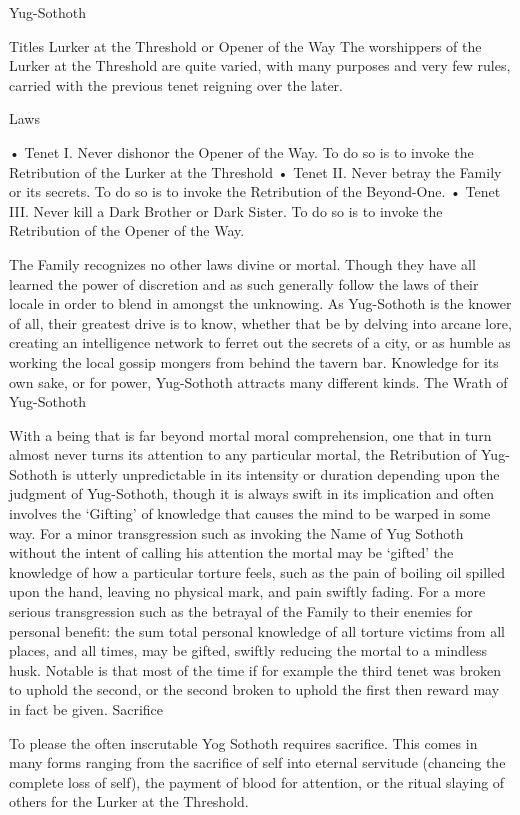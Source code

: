 \documentclass[blue]{guildcamp4}
\begin{document}
\name{\bYog{}}

Yug-Sothoth

Titles Lurker at the Threshold or Opener of the Way
The worshippers of the Lurker at the Threshold are quite varied, with many purposes and very few rules, carried with the previous tenet reigning over the later.

Laws

•	Tenet I. Never dishonor the Opener of the Way. To do so is to invoke the Retribution of the Lurker at the Threshold   
•	Tenet II. Never betray the Family or its secrets. To do so is to invoke the Retribution of the Beyond-One. 
•	Tenet III. Never kill a Dark Brother or Dark Sister. To do so is to invoke the Retribution of the Opener of the Way. 

The Family recognizes no other laws divine or mortal. Though they have all learned the power of discretion and as such generally follow the laws of their locale in order to blend in amongst the unknowing. As Yug-Sothoth is the knower of all, their greatest drive is to know, whether that be by delving into arcane lore, creating an intelligence network to ferret out the secrets of a city, or as humble as working the local gossip mongers from behind the tavern bar. Knowledge for its own sake, or for power, Yug-Sothoth attracts many different kinds.
The Wrath of Yug-Sothoth

With a being that is far beyond mortal moral comprehension, one that in turn almost never turns its attention to any particular mortal, the Retribution of Yug-Sothoth is utterly unpredictable in its intensity or duration depending upon the judgment of Yug-Sothoth, though it is always swift in its implication and often involves the ‘Gifting’ of knowledge that causes the mind to be warped in some way. For a minor transgression such as invoking the Name of Yug Sothoth without the intent of calling his attention the mortal may be ‘gifted’ the knowledge of how a particular torture feels, such as the pain of boiling oil spilled upon the hand, leaving no physical mark, and pain swiftly fading. For a more serious transgression such as the betrayal of the Family to their enemies for personal benefit: the sum total personal knowledge of all torture victims from all places, and all times, may be gifted, swiftly reducing the mortal to a mindless husk. Notable is that most of the time if for example the third tenet was broken to uphold the second, or the second broken to uphold the first then reward may in fact be given.
Sacrifice

To please the often inscrutable Yog Sothoth requires sacrifice. This comes in many forms ranging from the sacrifice of self into eternal servitude (chancing the complete loss of self), the payment of blood for attention, or the ritual slaying of others for the Lurker at the Threshold. 
\end{document}
